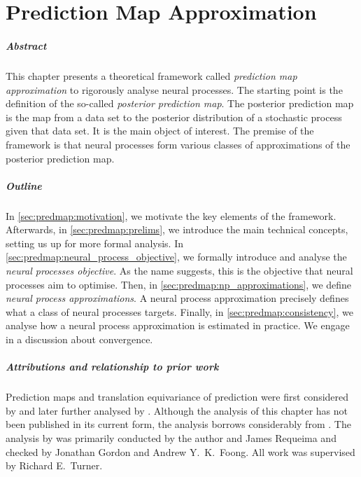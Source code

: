 \documentclass[12pt, twoside]{report}
\begin{document}
\chapter{Prediction Map Approximation}
\label{chap:predmap}

\paragraph{Abstract}
This chapter presents a theoretical framework called \emph{prediction map approximation} to
rigorously analyse neural processes.
The starting point is the definition of the so-called \emph{posterior prediction map}.
The posterior prediction map is the map from a data set to the posterior distribution of a stochastic process given that data set.
It is the main object of interest.
The premise of the framework is that neural processes form various classes of approximations of the posterior prediction map.

\paragraph{Outline}
In \cref{sec:predmap:motivation}, we motivate the key elements of the framework.
Afterwards, in \cref{sec:predmap:prelims}, we introduce the main technical concepts, setting us up for more formal analysis.
In \cref{sec:predmap:neural_process_objective}, we formally introduce and analyse the \emph{neural processes objective}.
As the name suggests, this is the objective that neural processes aim to optimise.
Then, in \cref{sec:predmap:np_approximations}, we define \emph{neural process approximations}.
A neural process approximation precisely defines what a class of neural processes targets.
Finally, in \cref{sec:predmap:consistency}, we analyse how a neural process approximation is estimated in practice.
We engage in a discussion about convergence.

\paragraph{Attributions and relationship to prior work}
Prediction maps and translation equivariance of prediction were first considered by  and later further analysed by .
Although the analysis of this chapter has not been published in its current form,
the analysis borrows considerably from \textcite{Bruinsma:2021:The_Gaussian_Neural_Process}.
The analysis by \textcite{Bruinsma:2021:The_Gaussian_Neural_Process} was primarily
conducted by the author and James Requeima and checked by Jonathan Gordon and Andrew Y.\ K.\ Foong.
All work was supervised by Richard E.\ Turner.
\end{document}
